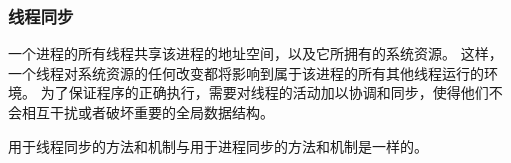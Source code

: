 {{        \subsubsection{线程同步}
        {
            一个进程的所有线程共享该进程的地址空间，以及它所拥有的系统资源。
            这样，一个线程对系统资源的任何改变都将影响到属于该进程的所有其他线程运行的环境。
            为了保证程序的正确执行，需要对线程的活动加以协调和同步，使得他们不会相互干扰或者破坏重要的全局数据结构。

            用于线程同步的方法和机制与用于进程同步的方法和机制是一样的。
        }
    }
}
